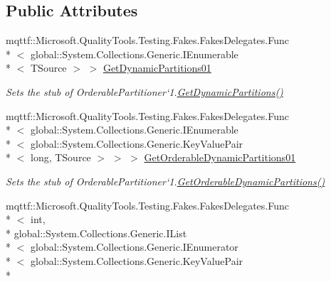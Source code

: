 \subsection*{Public Attributes}
\begin{DoxyCompactItemize}
\item 
mqttf\-::\-Microsoft.\-Quality\-Tools.\-Testing.\-Fakes.\-Fakes\-Delegates.\-Func\\*
$<$ global\-::\-System.\-Collections.\-Generic.\-I\-Enumerable\\*
$<$ T\-Source $>$ $>$ \hyperlink{class_system_1_1_collections_1_1_concurrent_1_1_fakes_1_1_stub_orderable_partitioner_3_01_t_source_01_4_acf3d8953f63bb2632d2697b1f26e7ca4}{Get\-Dynamic\-Partitions01}
\begin{DoxyCompactList}\small\item\em Sets the stub of Orderable\-Partitioner`1.\hyperlink{class_system_1_1_collections_1_1_concurrent_1_1_fakes_1_1_stub_orderable_partitioner_3_01_t_source_01_4_a5bf081b6944021eb3f37783d45302a69}{Get\-Dynamic\-Partitions()}\end{DoxyCompactList}\item 
mqttf\-::\-Microsoft.\-Quality\-Tools.\-Testing.\-Fakes.\-Fakes\-Delegates.\-Func\\*
$<$ global\-::\-System.\-Collections.\-Generic.\-I\-Enumerable\\*
$<$ global\-::\-System.\-Collections.\-Generic.\-Key\-Value\-Pair\\*
$<$ long, T\-Source $>$ $>$ $>$ \hyperlink{class_system_1_1_collections_1_1_concurrent_1_1_fakes_1_1_stub_orderable_partitioner_3_01_t_source_01_4_a6df7ac7b7c1059eb684e179657583160}{Get\-Orderable\-Dynamic\-Partitions01}
\begin{DoxyCompactList}\small\item\em Sets the stub of Orderable\-Partitioner`1.\hyperlink{class_system_1_1_collections_1_1_concurrent_1_1_fakes_1_1_stub_orderable_partitioner_3_01_t_source_01_4_ad3e506844616c71ccf5baefe68477c1f}{Get\-Orderable\-Dynamic\-Partitions()}\end{DoxyCompactList}\item 
mqttf\-::\-Microsoft.\-Quality\-Tools.\-Testing.\-Fakes.\-Fakes\-Delegates.\-Func\\*
$<$ int, \\*
global\-::\-System.\-Collections.\-Generic.\-I\-List\\*
$<$ global\-::\-System.\-Collections.\-Generic.\-I\-Enumerator\\*
$<$ global\-::\-System.\-Collections.\-Generic.\-Key\-Value\-Pair\\*

\end{DoxyCompactItemize}
